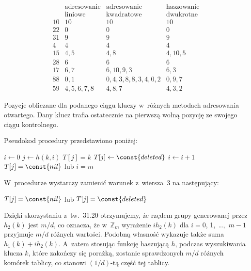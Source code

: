 \begin{table}[ht]
	\begin{center}
		\[
			\begin{array}{c|c|c|c}
				& \text{adresowanie} & \text{adresowanie} & \text{haszowanie} \\
				& \text{liniowe} & \text{kwadratowe} & \text{dwukrotne} \\
				\hline
				10 & 10 & 10 & 10 \\
				\hline
				22 & 0 & 0 & 0 \\
				\hline
				31 & 9 & 9 & 9 \\
				\hline
				4 & 4 & 4 & 4 \\
				\hline
				15 & 4,5 & 4,8 & 4,10,5 \\
				\hline
				28 & 6 & 6 & 6 \\
				\hline
				17 & 6,7 & 6,10,9,3 & 6,3 \\
				\hline
				88 & 0,1 & 0,4,3,8,8,3,4,0,2 & 0,9,7 \\
				\hline
				59 & 4,5,6,7,8 & 4,8,7 & 4,3,2
			\end{array}
		\]
	\end{center}
	\caption{Pozycje obliczane dla podanego ciągu kluczy w~różnych metodach adresowania otwartego. Dany klucz trafia ostatecznie na pierwszą wolną pozycję ze swojego ciągu kontrolnego.} \label{tab:11-1}
\end{table}

\exercise %
Pseudokod procedury  przedstawiono poniżej:
\begin{codebox}
\li	$i\gets0$
\li	\Repeat
		$j\gets h(k,i)$
\li		\If $T[j]=k$
\li			\Then
				$T[j]\gets\const{deleted}$
\li				\Return
			\End
\li		$i\gets i+1$
\li	\Until $T[j]=\const{nil}$ lub $i=m$
\end{codebox}
W~procedurze  wystarczy zamienić warunek z~wiersza~3 na następujący:
\begin{codebox}
\setcounter{codelinenumber}{2}
\li	\If $T[j]=\const{nil}$ lub $T[j]=\const{deleted}$
\end{codebox}

\exercise %
Dzięki skorzystaniu z~tw.~31.20 otrzymujemy, że rzędem grupy generowanej przez $h_2(k)$ jest $m/d$, co oznacza, że w~$\mathbb{Z}_m$ wyrażenie $ih_2(k)$ dla $i=0$, 1,~\dots,~$m-1$ przyjmuje $m/d$ różnych wartości. Podobną własność wykazuje także suma $h_1(k)+ih_2(k)$. A~zatem stosując funkcję haszującą $h$, podczas wyszukiwania klucza $k$, które zakończy się porażką, zostanie sprawdzonych $m/d$ różnych komórek tablicy, co stanowi $(1/d)$-tą część tej tablicy.


